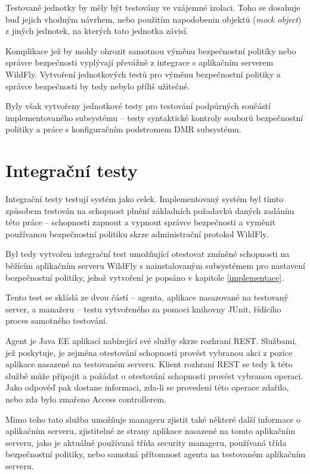 Testované jednotky by měly být testovány ve vzájemné izolaci. Toho se dosahuje buď jejich vhodným návrhem, nebo použitím napodobenin objektů ({\it mock object}) z jiných jednotek, na kterých tato jednotka závisí.

Komplikace jež by mohly ohrozit samotnou výměnu bezpečnostní politiky nebo správce bezpečnosti vyplývají převážně z integrace s aplikačním serverem WildFly. Vytvoření jednotkových testů pro výměnu bezpečnostní politiky a správce bezpečnosti by tedy nebylo příliš užitečné.

Byly však vytvořeny jednotkové testy pro testování podpůrných součástí implementovaného subsystému -- testy syntaktické kontroly souborů bezpečnostní politiky a práce s konfiguračním podstromem DMR subsystému.

\section{Integrační testy}

Integrační testy testují systém jako celek. Implementovaný systém byl tímto způsobem testován na schopnost plnění základních požadavků daných zadáním této práce -- schopnosti zapnout a vypnout správce bezpečnosti a vyměnit používanou bezpečnostní politiku skrze administrační protokol WildFly.

Byl tedy vytvořen integrační test umožňující otestovat zmíněné schopnosti na běžícím aplikačním serveru WildFly s nainstalovaným subsystémem pro nastavení bezpečnostní politiky, jehož vytvoření je popsáno v kapitole \ref{implementace}.

Tento test se skládá ze dvou částí -- agenta, aplikace nasazované na testovaný server, a manažeru -- testu vytvořeného za pomoci knihovny JUnit, řídícího proces samotného testování.

Agent je Java EE aplikací nabízející své služby skrze rozhraní REST. Službami, jež poskytuje, je zejména otestování schopnosti provést vybranou akci z pozice aplikace nasazené na testovaném serveru. Klient rozhraní REST se tedy k této službě může připojit a požádat o otestování schopnosti provést vybranou operaci. Jako odpověď pak dostane informaci, zda-li se provedení této operace zdařilo, nebo zda bylo zmařeno Access controllerem.

Mimo toho tato služba umožňuje manageru zjistit také některé další informace o aplikačním serveru, zjistitelné ze strany aplikace nasazené na tomto aplikačním serveru, jako je aktuálně používaná třída security manageru, používaná třída bezpečnostní politiky, nebo samotná přítomnost agenta na testovaném aplikačním serveru.

